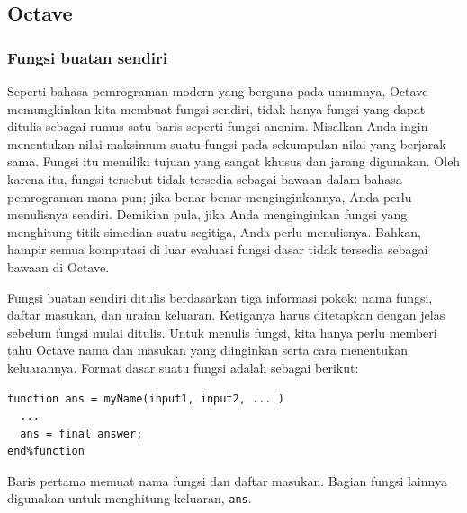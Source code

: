 \subsection{Octave}

\subsubsection{Fungsi buatan sendiri}

Seperti bahasa pemrograman modern yang berguna pada umumnya, Octave
memungkinkan kita membuat fungsi sendiri, tidak hanya fungsi yang
dapat ditulis sebagai rumus satu baris seperti fungsi anonim. Misalkan
Anda ingin menentukan nilai maksimum suatu fungsi pada sekumpulan
nilai yang berjarak sama. Fungsi itu memiliki tujuan yang sangat khusus
dan jarang digunakan. Oleh karena itu, fungsi tersebut tidak tersedia
sebagai bawaan dalam bahasa pemrograman mana pun; jika benar-benar
menginginkannya, Anda perlu menulisnya sendiri. Demikian pula, jika
Anda menginginkan fungsi yang menghitung titik simedian suatu segitiga,
Anda perlu menulisnya. Bahkan, hampir semua komputasi di luar evaluasi
fungsi dasar tidak tersedia sebagai bawaan di Octave.

Fungsi buatan sendiri ditulis berdasarkan tiga informasi pokok: nama
fungsi, daftar masukan, dan uraian keluaran. Ketiganya harus ditetapkan
dengan jelas sebelum fungsi mulai ditulis. Untuk menulis fungsi, kita
hanya perlu memberi tahu Octave nama dan masukan yang diinginkan serta
cara menentukan keluarannya. Format dasar suatu fungsi adalah sebagai
berikut:\begin{verbatim}
function ans = myName(input1, input2, ... )
  ...
  ans = final answer;
end%function
\end{verbatim}Baris pertama memuat nama fungsi dan daftar masukan. Bagian fungsi
lainnya digunakan untuk menghitung keluaran, \texttt{ans}.

